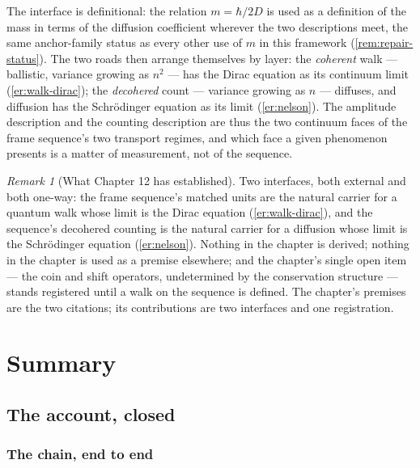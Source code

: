 \documentclass[11pt]{amsbook}
\theoremstyle{plain}
\theoremstyle{definition}
\theoremstyle{remark}
\newtheorem{remark}[theorem]{Remark}
\begin{document}
The interface is definitional: the relation $m = \hbar/2D$ is used as a definition of the mass in terms of the diffusion coefficient wherever the two descriptions meet, the same anchor-family status as every other use of $m$ in this framework (\cref{rem:repair-status}). The two roads then arrange themselves by layer: the \emph{coherent} walk --- ballistic, variance growing as $n^{2}$ --- has the Dirac equation as its continuum limit (\cref{er:walk-dirac}); the \emph{decohered} count --- variance growing as $n$ --- diffuses, and diffusion has the Schr\"odinger equation as its limit (\cref{er:nelson}). The amplitude description and the counting description are thus the two continuum faces of the frame sequence's two transport regimes, and which face a given phenomenon presents is a matter of measurement, not of the sequence.

\begin{remark}[What Chapter 12 has established]\label{rem:ch12summary}
Two interfaces, both external and both one-way: the frame sequence's matched units are the natural carrier for a quantum walk whose limit is the Dirac equation (\cref{er:walk-dirac}), and the sequence's decohered counting is the natural carrier for a diffusion whose limit is the Schr\"odinger equation (\cref{er:nelson}). Nothing in the chapter is derived; nothing in the chapter is used as a premise elsewhere; and the chapter's single open item --- the coin and shift operators, undetermined by the conservation structure --- stands registered until a walk on the sequence is defined. The chapter's premises are the two citations; its contributions are two interfaces and one registration.
\end{remark}

\part{Summary}

\chapter{The account, closed}\label{ch:conclusion}

\section{The chain, end to end}\label{sec:chain-closure}
\end{document}
